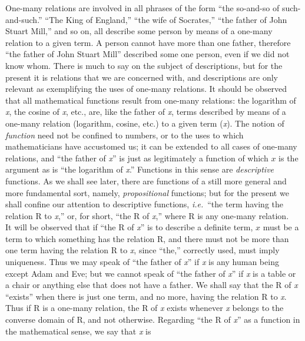 {One-many relations are involved in all phrases of the
form
``the
so-and-so of such-and-such.'' ``The King of England,''   ``the wife of
Socrates,'' ``the father of John Stuart Mill,'' and so on, all describe
some person by means of a one-many relation to a given term. A person
cannot have more than one father, therefore ``the father of John Stuart
Mill'' described some one person, even if we did not know whom. There is
much to say on the subject of descriptions, but for the present it is
relations that we are concerned with, and descriptions are only
relevant as exemplifying the uses of one-many relations. It should be
observed that all mathematical functions result from one-many
relations: the logarithm of \textit{x},
the cosine of \textit{x},
etc., are, like the
father of \textit{x},
terms described by means of a one-many relation
(logarithm, cosine, etc.) to a given term (\textit{x}). The notion of \textit{function}
need not be confined to numbers, or to the uses to which mathematicians
have accustomed us; it can be extended to all cases of one-many
relations, and ``the father of \textit{x}''
is just as legitimately a function of
which $x$ is the argument as is ``the logarithm of \textit{x}.'' Functions in
this
sense are \textit{descriptive}
functions. As we shall see later, there are
functions of a still more general and more fundamental sort, namely,
\textit{propositional}
functions; but for the present we shall confine our
attention to descriptive functions, \textit{i.e.}\ ``the term
having the relation
R to \textit{x},''
or, for short, ``the R of \textit{x},''
where R is any one-many relation.\\
\indent It will be observed that if ``the R of \textit{x}'' is to describe a
definite
term, $x$ must be a term to which something has the relation R, and there
must not be more than one term having the relation R to \textit{x}, since ``the,''
correctly used, must imply uniqueness. Thus we may speak of ``the father
of \textit{x}'' if \textit{x} is any human
being
except
Adam and Eve; but we cannot speak of ``the father of \textit{x}'' if \textit{x} is a table
or a chair or anything else that does not have a father. We shall say
that the R of \textit{x}
``exists'' when there is just one term, and no more,
having the relation R to \textit{x}.
Thus if R is a one-many relation, the R of \textit{x} exists whenever
\textit{x}
belongs
to the converse domain of R, and not otherwise. Regarding ``the R of \textit{x}'' as a function in
the mathematical  
sense, we say
that \textit{x} is
}
